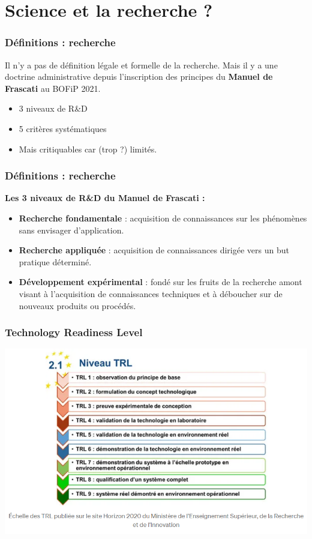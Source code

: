 \documentclass[xcolor=dvipsnames]{beamer}
\begin{document}
	\section{Science et la recherche ?}
	\begin{frame}
		\frametitle{Définitions : recherche}
		Il n'y a pas de définition légale et formelle de la recherche. Mais il y a une doctrine administrative depuis l'inscription des principes du \textbf{Manuel de Frascati} au BOFiP 2021.
		\begin{itemize}
			\item 3 niveaux de R\&D
			\item 5 critères systématiques
			\item Mais critiquables car (trop ?) limités.
		\end{itemize}
	\end{frame}
	\begin{frame}
		\frametitle{Définitions : recherche}
		\textbf{Les 3 niveaux de R\&D du Manuel de Frascati :}
		\begin{itemize}
			\item \textbf{Recherche fondamentale} : acquisition de connaissances sur les phénomènes sans envisager d'application.
			\item \textbf{Recherche appliquée} : acquisition de connaissances dirigée vers un but pratique déterminé.
			\item \textbf{Développement expérimental} : fondé sur les fruits de la recherche amont visant à l'acquisition de connaissances techniques et à déboucher sur de nouveaux produits ou procédés.
		\end{itemize}
	\end{frame}
	\begin{frame}
		\frametitle{Technology Readiness Level}
		\centering
		\includegraphics[scale=0.8]{TRL.PNG}
	\end{frame}
\end{document}
